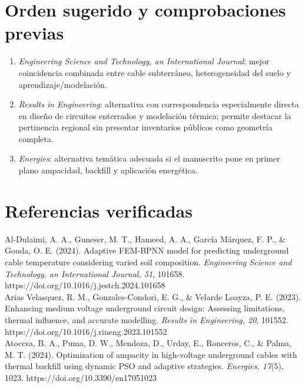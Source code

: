 \documentclass[11pt,a4paper,oneside]{report}
\begin{document}
\chapter*{Orden sugerido y comprobaciones previas}
\begin{enumerate}
  \item \textit{Engineering Science and Technology, an International Journal}: mejor coincidencia combinada entre cable subterr\'aneo, heterogeneidad del suelo y aprendizaje/modelaci\'on.
  \item \textit{Results in Engineering}: alternativa con correspondencia especialmente directa en dise\~no de circuitos enterrados y modelaci\'on t\'ermica; permite destacar la pertinencia regional sin presentar inventarios p\'ublicos como geometr\'ia completa.
  \item \textit{Energies}: alternativa tem\'atica adecuada si el manuscrito pone en primer plano ampacidad, backfill y aplicaci\'on energ\'etica.
\end{enumerate}

\chapter*{Referencias verificadas}
Al-Dulaimi, A. A., Guneser, M. T., Hameed, A. A., Garc\'ia M\'arquez, F. P., \& Gouda, O. E. (2024). Adaptive FEM-BPNN model for predicting underground cable temperature considering varied soil composition. \textit{Engineering Science and Technology, an International Journal, 51}, 101658. https://doi.org/10.1016/j.jestch.2024.101658\\
Arias Velasquez, R. M., Gonzales-Condori, E. G., \& Velarde Loayza, P. E. (2023). Enhancing medium voltage underground circuit design: Assessing limitations, thermal influence, and accurate modelling. \textit{Results in Engineering, 20}, 101552. https://doi.org/10.1016/j.rineng.2023.101552\\
Atoccsa, B. A., Puma, D. W., Mendoza, D., Urday, E., Ronceros, C., \& Palma, M. T. (2024). Optimization of ampacity in high-voltage underground cables with thermal backfill using dynamic PSO and adaptive strategies. \textit{Energies, 17}(5), 1023. https://doi.org/10.3390/en17051023
\end{document}
